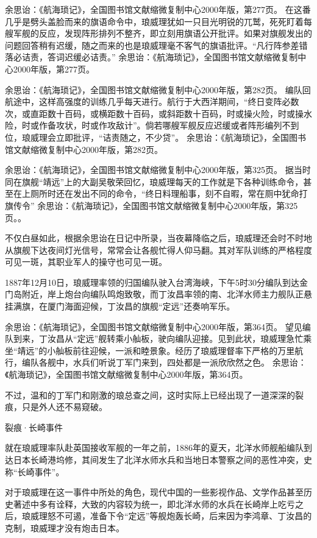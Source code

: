 \documentclass[12pt,UTF8]{ctexbook}
\begin{document}
余思诒：《航海琐记》，全国图书馆文献缩微复制中心2000年版，第277页。
在这番几乎是劈头盖脸而来的旗语命令中，琅威理犹如一只目光明锐的兀鹫，死死盯着每艘军舰的反应，发现阵形排列不整齐，即立刻用旗语公开批评。如果对旗舰发出的问题回答稍有迟缓，随之而来的也是琅威理毫不客气的旗语批评。“凡行阵参差错落必诘责，答词迟缓必诘责。” 余思诒：《航海琐记》，全国图书馆文献缩微复制中心2000年版，第277页。

余思诒：《航海琐记》，全国图书馆文献缩微复制中心2000年版，第282页。
编队回航途中，这样高强度的训练几乎每天进行。航行于大西洋期间，“终日变阵必数次，或直距数十百码，或横距数十百码，或斜距数十百码，时或操火险，时或操水险，时或作备攻状，时或作攻敌计”。倘若哪艘军舰反应迟缓或者阵形编列不到位，琅威理会立即批评，“诘责随之，不少贷”。 余思诒：《航海琐记》，全国图书馆文献缩微复制中心2000年版，第282页。

余思诒：《航海琐记》，全国图书馆文献缩微复制中心2000年版，第325页。
据当时同在旗舰“靖远”上的大副吴敬荣回忆，琅威理每天的工作就是下各种训练命令，甚至在上厕所时还在发出不同的命令，“终日料理船事，刻不自暇，常在厕中犹命打旗传令” 余思诒：《航海琐记》，全国图书馆文献缩微复制中心2000年版，第325页。。

不仅白昼如此，根据余思诒在日记中所录，当夜幕降临之后，琅威理还会时不时地从旗舰下达夜间灯光信号，常常会让各舰忙得人仰马翻。其对军队训练的严格程度可见一斑，其职业军人的操守也可见一斑。

1887年12月10日，琅威理率领的归国编队驶入台湾海峡，下午5时30分编队到达金门岛附近，岸上炮台向编队鸣炮致敬，而丁汝昌率领的南、北洋水师主力舰队正悬挂满旗，在厦门海面迎候，丁汝昌的旗舰“定远”还奏响军乐。

余思诒：《航海琐记》，全国图书馆文献缩微复制中心2000年版，第364页。
望见编队到来，丁汝昌从“定远”舰转乘小舢板，驶向编队迎接。见到此状，琅威理急忙乘坐“靖远”的小舢板前往迎候，一派和睦景象。经历了琅威理督率下严格的万里航行，编队各舰中，水兵们听说丁军门来到，四处都是一派欣欣然之色。 余思诒：《航海琐记》，全国图书馆文献缩微复制中心2000年版，第364页。

不过，温和的丁军门和刚激的琅总查之间，这时实际上已经出现了一道深深的裂痕，只是外人还不易窥破。

裂痕·长崎事件

就在琅威理率队赴英国接收军舰的一年之前，1886年的夏天，北洋水师舰船编队到达日本长崎港坞修，其间发生了北洋水师水兵和当地日本警察之间的恶性冲突，史称“长崎事件”。

对于琅威理在这一事件中所处的角色，现代中国的一些影视作品、文学作品甚至历史著述中多有诠释，大致的内容较为统一，即北洋水师的水兵在长崎岸上吃亏之后，琅威理怒不可遏，准备下令“定远”等舰炮轰长崎，后来因为李鸿章、丁汝昌的克制，琅威理才没有炮击日本。
\end{document}
